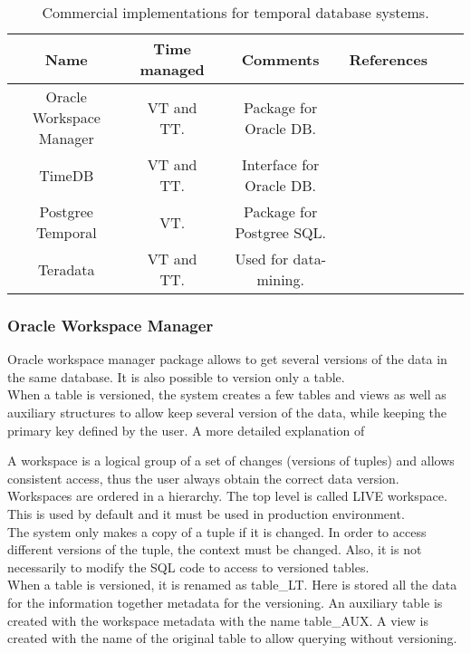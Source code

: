 \begin{table}
\centering
\caption{Commercial implementations for temporal database systems. }
\begin{tabular}{c c c c c c }
\hline
\textbf{Name} & \textbf{Time managed} & \textbf{Comments} & \textbf{References}  \\ \hline
Oracle Workspace Manager & VT and TT. & Package for Oracle DB. & \cite{oracle2009}\\
TimeDB & VT and TT. & Interface for Oracle DB. & \cite{timedb2005}\\
Postgree Temporal & VT. & Package for Postgree SQL. & \cite{posgree2009}\\
Teradata & VT and TT. & Used for data-mining. & \cite{teradata2011}\\
\hline 
\end{tabular}
\label{table:commercial-temporal-db}



\end{table}

\subsubsection{Oracle Workspace Manager}
Oracle workspace manager \cite{OraE118602} package allows to get several versions of the data in the same database. It is also possible to version only a table.\\
When a table is versioned, the system creates a few tables and views as well as auxiliary structures to allow keep several version of the data, while keeping the primary key defined by the user. A more detailed explanation of 

A workspace is a logical group of a set of changes (versions of tuples) and allows consistent access, thus the user always obtain the correct data version. Workspaces are ordered in a hierarchy. The top level is called LIVE workspace. This is used by default and it must be used in production environment.\\
The system only makes a copy of a tuple if it is changed. In order to access different versions of the tuple, the context must be changed. Also, it is not necessarily to modify the SQL code to access to versioned tables.\\
When a table is versioned, it is renamed as table\_LT. Here is stored all the data for the information together metadata for the versioning. An auxiliary table is created with the workspace metadata with the name table\_AUX. A view is created with the name of the original table to allow querying without versioning.

